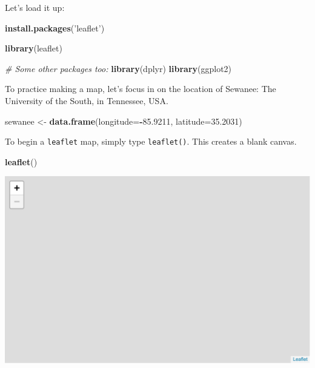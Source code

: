 \documentclass[]{book}
\newenvironment{Shaded}{\begin{snugshade}}{\end{snugshade}}
\newcommand{\CommentTok}[1]{\textcolor[rgb]{0.56,0.35,0.01}{\textit{#1}}}
\newcommand{\DataTypeTok}[1]{\textcolor[rgb]{0.13,0.29,0.53}{#1}}
\newcommand{\FloatTok}[1]{\textcolor[rgb]{0.00,0.00,0.81}{#1}}
\newcommand{\KeywordTok}[1]{\textcolor[rgb]{0.13,0.29,0.53}{\textbf{#1}}}
\newcommand{\NormalTok}[1]{#1}
\newcommand{\OperatorTok}[1]{\textcolor[rgb]{0.81,0.36,0.00}{\textbf{#1}}}
\newcommand{\StringTok}[1]{\textcolor[rgb]{0.31,0.60,0.02}{#1}}
\begin{document}
Let's load it up:

\begin{Shaded}
\begin{Highlighting}[]
\KeywordTok{install.packages}\NormalTok{(}\StringTok{'leaflet'}\NormalTok{)}
\end{Highlighting}
\end{Shaded}

\begin{Shaded}
\begin{Highlighting}[]
\KeywordTok{library}\NormalTok{(leaflet)}

\CommentTok{# Some other packages too:}
\KeywordTok{library}\NormalTok{(dplyr)}
\KeywordTok{library}\NormalTok{(ggplot2)}
\end{Highlighting}
\end{Shaded}

To practice making a map, let's focus in on the location of Sewanee: The University of the South, in Tennessee, USA.

\begin{Shaded}
\begin{Highlighting}[]
\NormalTok{sewanee <-}\StringTok{ }\KeywordTok{data.frame}\NormalTok{(}\DataTypeTok{longitude=}\OperatorTok{-}\FloatTok{85.9211}\NormalTok{, }
                      \DataTypeTok{latitude=}\FloatTok{35.2031}\NormalTok{)}
\end{Highlighting}
\end{Shaded}

To begin a \texttt{leaflet} map, simply type \texttt{leaflet()}. This creates a blank canvas.

\begin{Shaded}
\begin{Highlighting}[]
\KeywordTok{leaflet}\NormalTok{()}
\end{Highlighting}
\end{Shaded}

\includegraphics{figures/unnamed-chunk-386-1.pdf}
\end{document}
